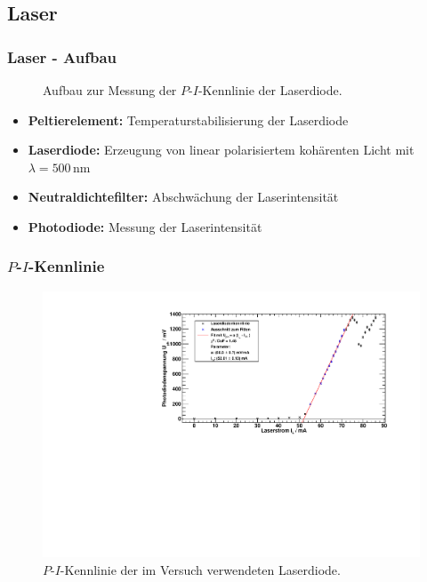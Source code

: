 
\subsection{Laser}



\begin{frame}
\frametitle{Laser - Aufbau}

\begin{figure}
    \centering
    \def\svgwidth{\textwidth}
    
    \caption{Aufbau zur Messung der $P$-$I$-Kennlinie der Laserdiode.}
\end{figure}


\begin{itemize}
  \item \textbf{Peltierelement:} Temperaturstabilisierung der Laserdiode
  \item \textbf{Laserdiode:} Erzeugung von linear polarisiertem kohärenten Licht mit $\lambda=500$\,nm
  \item \textbf{Neutraldichtefilter:} Abschwächung der Laserintensität
  \item \textbf{Photodiode:} Messung der Laserintensität
\end{itemize}


\end{frame}






\begin{frame}
\frametitle{$P$-$I$-Kennlinie}

\begin{figure}[H]
    \begin{center}
        \includegraphics[width=\textwidth]{../img/diodenkennlinie.pdf}
        \caption{$P$-$I$-Kennlinie der im Versuch verwendeten Laserdiode.}
    \end{center}
\end{figure}



\end{frame}


